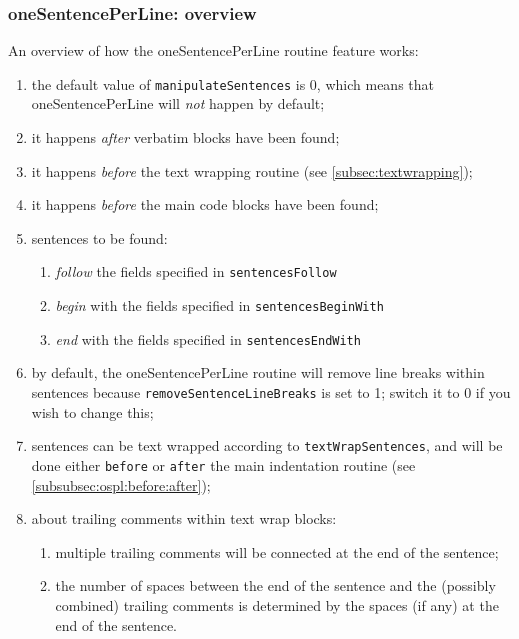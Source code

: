 \subsubsection{oneSentencePerLine: overview}
 An overview of how the oneSentencePerLine routine feature works:
 \begin{enumerate}
  \item the default value of \texttt{manipulateSentences} is 0, which means that
        oneSentencePerLine will \emph{not} happen by default;
  \item it happens \emph{after} verbatim blocks have been found;
  \item it happens \emph{before} the text wrapping routine (see
        \cref{subsec:textwrapping});
  \item it happens \emph{before} the main code blocks have been found;
  \item sentences to be found:
        \begin{enumerate}
         \item \emph{follow} the fields specified in \texttt{sentencesFollow}
         \item \emph{begin} with the fields specified in \texttt{sentencesBeginWith}
         \item \emph{end} with the fields specified in \texttt{sentencesEndWith}
        \end{enumerate}
  \item by default, the oneSentencePerLine routine will remove line breaks within
        sentences because \texttt{removeSentenceLineBreaks} is set to 1; switch it to 0 if
        you wish to change this;
  \item sentences can be text wrapped according to \texttt{textWrapSentences}, and will
        be done either \texttt{before} or \texttt{after} the main indentation routine
        (see \cref{subsubsec:ospl:before:after});
  \item about trailing comments within text wrap blocks:
        \begin{enumerate}
         \item multiple trailing comments will be connected at the end of the sentence;
         \item the number of spaces between the end of the sentence and the (possibly
               combined) trailing comments is determined by the spaces (if any) at the
               end of the sentence.
        \end{enumerate}
 \end{enumerate}

